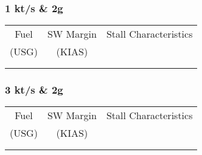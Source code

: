 % 
% 
%
\Large
\subsubsection*{1 kt/s \& 2g}
  \begin{tabularx}{\textwidth}{|c|c|X|}
    \hline
    Fuel&SW Margin&Stall Characteristics\\
    (USG)&(KIAS)&\\
    \hline
    \hline
    &&\\
    \hline
    &&\\
    \hline
    \end{tabularx}     

\subsubsection*{3 kt/s \& 2g}
  \begin{tabularx}{\textwidth}{|c|c|X|}
    \hline
    Fuel&SW Margin&Stall Characteristics\\
    (USG)&(KIAS)&\\
    \hline
    \hline
    &&\\
    \hline
    &&\\
    \hline
    \end{tabularx}     
    \normalsize

   